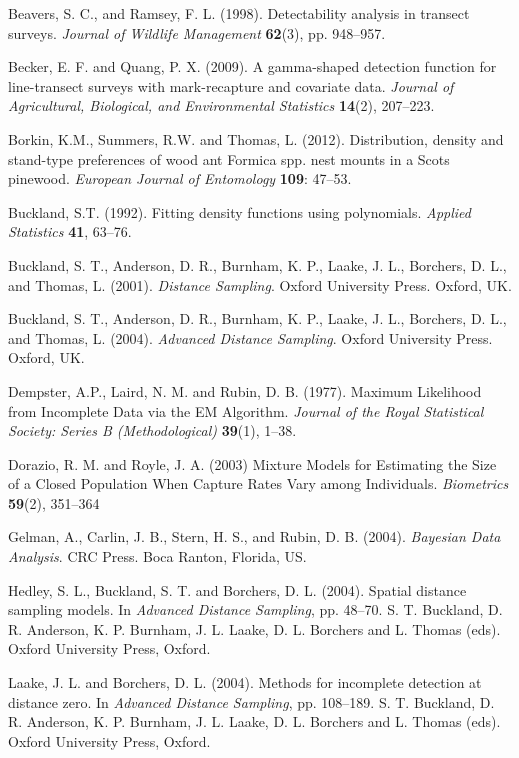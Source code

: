 \documentclass[useAMS,referee]{biom}
\begin{document}
\begin{thebibliography}{}

\bibitem{ } Beavers, S. C., and Ramsey, F. L. (1998). Detectability analysis in transect surveys. \textit{Journal of Wildlife Management} \textbf{62}(3), pp. 948--957.

\bibitem{ } Becker, E. F. and Quang, P. X. (2009). A gamma-shaped detection function for line-transect surveys with mark-recapture and covariate data. \textit{Journal of Agricultural, Biological, and Environmental Statistics} \textbf{14}(2), 207--223.

\bibitem{ } Borkin, K.M., Summers, R.W. and Thomas, L. (2012). Distribution, density and stand-type preferences of wood ant Formica spp. nest mounts in a Scots pinewood. \textit{European Journal of Entomology} \textbf{109}: 47--53.

\bibitem{ } Buckland, S.T. (1992). Fitting density functions using polynomials. \textit{Applied Statistics} \textbf{41}, 63--76. 

\bibitem{ }  Buckland, S. T., Anderson, D. R., Burnham, K. P., Laake, J. L., Borchers, D. L., and Thomas, L.  (2001). \textit{Distance Sampling}. Oxford University Press. Oxford, UK.

\bibitem{ }  Buckland, S. T., Anderson, D. R., Burnham, K. P., Laake, J. L., Borchers, D. L., and Thomas, L.  (2004). \textit{Advanced Distance Sampling}. Oxford University Press. Oxford, UK.

\bibitem{ } Dempster, A.P., Laird,  N. M. and Rubin, D. B. (1977). Maximum Likelihood from Incomplete Data via the EM Algorithm. \textit{Journal of the Royal Statistical Society: Series B (Methodological)} \textbf{39}(1), 1--38.

\bibitem{ } Dorazio, R. M. and Royle, J. A. (2003) Mixture Models for Estimating the Size of a Closed Population When Capture Rates Vary among Individuals. \textit{Biometrics} \textbf{59}(2), 351--364 

\bibitem{ }  Gelman, A., Carlin, J. B., Stern, H. S., and Rubin, D. B. (2004). \textit{Bayesian Data Analysis}. CRC Press. Boca Ranton, Florida, US.

\bibitem{ } Hedley, S. L., Buckland, S. T. and Borchers, D. L. (2004). Spatial distance sampling models. In \textit{Advanced Distance Sampling}, pp. 48--70. S. T. Buckland, D. R. Anderson, K. P. Burnham, J. L. Laake, D. L. Borchers and L. Thomas (eds). Oxford University Press, Oxford.

\bibitem{ } Laake, J. L. and Borchers, D. L. (2004). Methods for incomplete detection at distance zero. In \textit{Advanced Distance Sampling}, pp. 108--189. S. T. Buckland, D. R. Anderson, K. P. Burnham, J. L. Laake, D. L. Borchers and L. Thomas (eds). Oxford University Press, Oxford.


\end{thebibliography}
\end{document}
